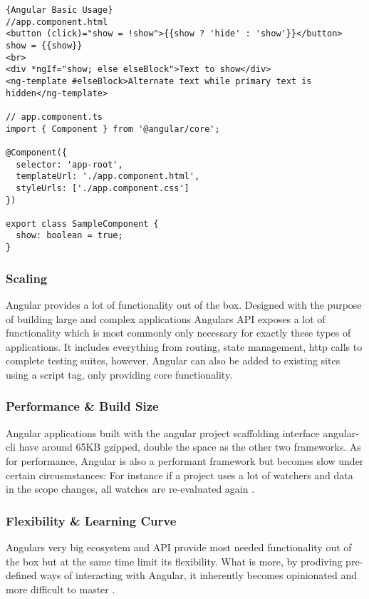 \begin{lstlisting}[caption=Angular Basic Usage Example, captionpos=b, style=htmlcssjs]{Angular Basic Usage}
//app.component.html
<button (click)="show = !show">{{show ? 'hide' : 'show'}}</button>
show = {{show}}
<br>
<div *ngIf="show; else elseBlock">Text to show</div>
<ng-template #elseBlock>Alternate text while primary text is hidden</ng-template>

// app.component.ts
import { Component } from '@angular/core';

@Component({
  selector: 'app-root',
  templateUrl: './app.component.html',
  styleUrls: ['./app.component.css']
})

export class SampleComponent {
  show: boolean = true;
}
\end{lstlisting}

\subsubsection{Scaling}
Angular provides a lot of functionality out of the box. Designed with the purpose of building large and complex applications Angulars API exposes a lot of functionality which is most commonly only necessary for exactly these types of applications. It includes everything from routing, state management, http calls to complete testing suites, however, Angular can also be added to existing sites using a script tag, only providing core functionality.

\subsubsection{Performance \& Build Size}
Angular applications built with the angular project scaffolding interface angular-cli have around 65KB gzipped, double the space as the other two frameworks. As for performance, Angular is also a performant framework \cite{FrameworksPerformance:online} but becomes slow under certain circusmstances: For instance if a project uses a lot of watchers and data in the scope changes, all watches are re-evaluated again \cite{ComparisonVue:online}.

\subsubsection{Flexibility \& Learning Curve}
 Angulars very big ecosystem and API provide most needed functionality out of the box but at the same time limit its flexibility. What is more, by prodiving pre-defined ways of interacting with Angular, it inherently becomes opinionated and more difficult to master \cite{ComparisonVue:online}.


